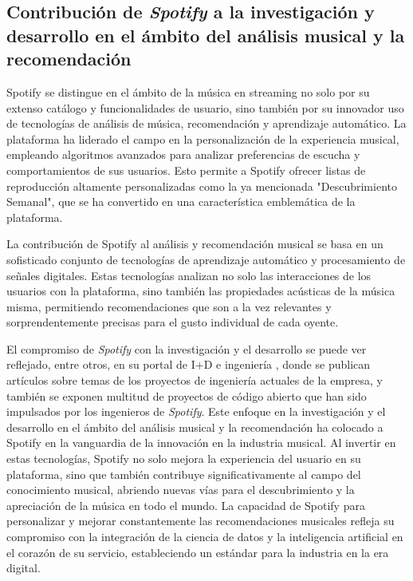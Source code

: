 \subsection{Contribución de \textit{Spotify} a la investigación y desarrollo en el ámbito del análisis musical y la recomendación\label{SEC:CONTRIBUCION_SPOTIFY}}

Spotify se distingue en el ámbito de la música en streaming no solo por su extenso catálogo y funcionalidades de usuario, sino también por su innovador uso 
de tecnologías de análisis de música, recomendación y aprendizaje automático. La plataforma ha liderado el campo en la personalización de la experiencia 
musical, empleando algoritmos avanzados para analizar preferencias de escucha y comportamientos de sus usuarios. Esto permite a Spotify ofrecer listas de 
reproducción altamente personalizadas como la ya mencionada "Descubrimiento Semanal", que se ha convertido en una característica emblemática de la plataforma.

La contribución de Spotify al análisis y recomendación musical se basa en un sofisticado conjunto de tecnologías de aprendizaje automático y procesamiento
 de señales digitales. Estas tecnologías analizan no solo las interacciones de los usuarios con la plataforma, sino también las propiedades acústicas de 
 la música misma, permitiendo recomendaciones que son a la vez relevantes y sorprendentemente precisas para el gusto individual de cada oyente.

El compromiso de \textit{Spotify} con la investigación y el desarrollo se puede ver reflejado, entre otros, en su portal de I+D e ingeniería
\cite{SpotifyEngineeringBlog}, donde se publican artículos sobre temas de los proyectos de ingeniería actuales de la empresa, y también se exponen 
multitud de proyectos de código abierto que han sido impulsados por los ingenieros de \textit{Spotify}. Este enfoque en la investigación y el desarrollo 
en el ámbito del análisis musical y la recomendación ha colocado a Spotify en la vanguardia de la innovación en la industria musical. Al invertir en estas 
tecnologías, Spotify no solo mejora la experiencia del usuario en su plataforma, sino que también contribuye significativamente al campo del conocimiento 
musical, abriendo nuevas vías para el descubrimiento y la apreciación de la música en todo el mundo. La capacidad de Spotify para personalizar y mejorar 
constantemente las recomendaciones musicales refleja su compromiso con la integración de la ciencia de datos y la inteligencia artificial en el corazón 
de su servicio, estableciendo un estándar para la industria en la era digital.



